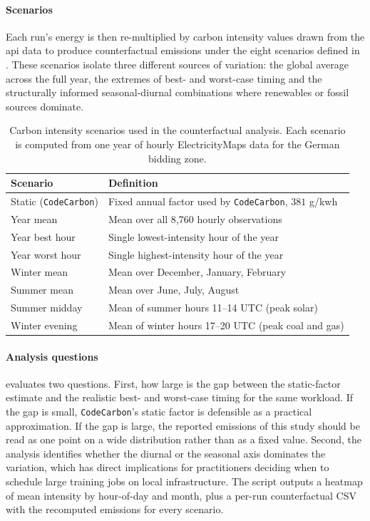 \paragraph{Scenarios}
Each run's energy is then re-multiplied by carbon intensity values drawn from the \gls{api} data to produce counterfactual emissions under the eight scenarios defined in . These scenarios isolate three different sources of variation: the global average across the full year, the extremes of best- and worst-case timing and the structurally informed seasonal-diurnal combinations where renewables or fossil sources dominate.

\begin{table}[htbp]
\centering
\caption[Carbon intensity scenarios for counterfactual analysis.]{Carbon intensity scenarios used in the counterfactual analysis. Each scenario is computed from one year of hourly ElectricityMaps data for the German bidding zone.}
\label{tab:carbon_scenarios}
\begin{tabular}{ll}
\toprule
\textbf{Scenario} & \textbf{Definition} \\
\midrule
Static (\texttt{CodeCarbon}) & Fixed annual factor used by \texttt{CodeCarbon}, $381$ g/\gls{kwh} \\
Year mean           & Mean over all 8{,}760 hourly observations \\
Year best hour      & Single lowest-intensity hour of the year \\
Year worst hour     & Single highest-intensity hour of the year \\
Winter mean         & Mean over December, January, February \\
Summer mean         & Mean over June, July, August \\
Summer midday       & Mean of summer hours 11--14 UTC (peak solar) \\
Winter evening      & Mean of winter hours 17--20 UTC (peak coal and gas) \\
\bottomrule
\end{tabular}
\end{table}

\paragraph{Analysis questions}
 evaluates two questions. First, how large is the gap between the static-factor estimate and the realistic best- and worst-case timing for the same workload. If the gap is small, \texttt{CodeCarbon}'s static factor is defensible as a practical approximation. If the gap is large, the reported emissions of this study should be read as one point on a wide distribution rather than as a fixed value. Second, the analysis identifies whether the diurnal or the seasonal axis dominates the variation, which has direct implications for practitioners deciding when to schedule large training jobs on local infrastructure. The script outputs a heatmap of mean intensity by hour-of-day and month, plus a per-run counterfactual CSV with the recomputed emissions for every scenario.

